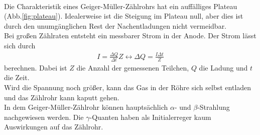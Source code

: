 \\Die Charakteristik eines Geiger-Müller-Zählrohrs hat ein auffälliges Plateau (Abb.\ref{fig:plateau}).
Idealerweise ist die Steigung im Plateau null, aber dies ist durch den unumgänglichen Rest der Nachentladungen nicht vermeidbar.
\\Bei großen Zählraten entsteht ein messbarer Strom in der Anode.
Der Strom lässt sich durch
\begin{align}
  I= \frac{\Delta Q}{\Delta t}Z \leftrightarrow \Delta Q = \frac{I \Delta t}{Z}
  \label{eqn:I}
\end{align}
berechnen.
Dabei ist $Z$ die Anzahl der gemessenen Teilchen, $Q$ die Ladung und $t$ die Zeit.
\\Wird die Spannung noch größer, kann das Gas in der Röhre sich selbst entladen und das Zählrohr kann kaputt gehen.
\\In dem Geiger-Müller-Zählrohr können hauptsächlich $\alpha$- und $\beta$-Strahlung nachgewiesen werden.
Die $\gamma$-Quanten haben als Initialerreger kaum Auswirkungen auf das Zählrohr.



\FloatBarrier
